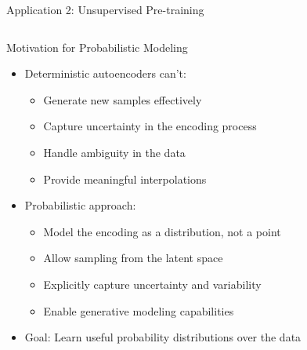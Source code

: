 \documentclass[5pt,aspectratio=169]{beamer}
\begin{document}
\begin{frame}{Application 2: Unsupervised Pre-training}
\begin{columns}
  \end{columns}
\end{frame}

\begin{frame}{Motivation for Probabilistic Modeling}
  \begin{itemize}
    \item Deterministic autoencoders can't:
      \begin{itemize}
        \item Generate new samples effectively
        \item Capture uncertainty in the encoding process
        \item Handle ambiguity in the data
        \item Provide meaningful interpolations
      \end{itemize}
    \item Probabilistic approach:
      \begin{itemize}
        \item Model the encoding as a distribution, not a point
        \item Allow sampling from the latent space
        \item Explicitly capture uncertainty and variability
        \item Enable generative modeling capabilities
      \end{itemize}
    \item Goal: Learn useful probability distributions over the data
  \end{itemize}
  
 
\end{frame}
\end{document}
